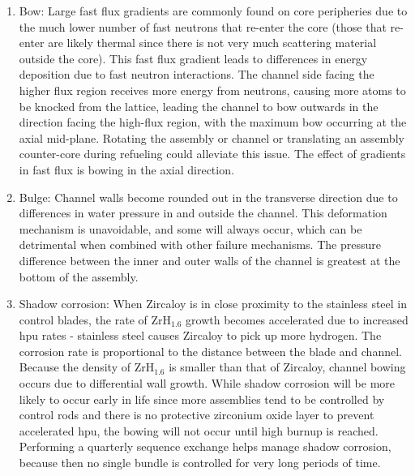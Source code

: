 \documentclass[10pt]{article}
\begin{document}
\begin{enumerate}
\item Bow: Large fast flux gradients are commonly found on core peripheries due to the much lower number of fast neutrons that re-enter the core (those that re-enter are likely thermal since there is not very much scattering material outside the core). This fast flux gradient leads to differences in energy deposition due to fast neutron interactions. The channel side facing the higher flux region receives more energy from neutrons, causing more atoms to be knocked from the lattice, leading the channel to bow outwards in the direction facing the high-flux region, with the maximum bow occurring at the axial mid-plane. Rotating the assembly or channel or translating an assembly counter-core during refueling could alleviate this issue. The effect of gradients in fast flux is bowing in the axial direction.
\item Bulge: Channel walls become rounded out in the transverse direction due to differences in water pressure in and outside the channel. This deformation mechanism is unavoidable, and some will always occur, which can be detrimental when combined with other failure mechanisms. The pressure difference between the inner and outer walls of the channel is greatest at the bottom of the assembly.
\item Shadow corrosion: When Zircaloy is in close proximity to the stainless steel in control blades, the rate of \(\textrm{ZrH}_{1.6}\) growth becomes accelerated due to increased \gls{hpu} rates - stainless steel causes Zircaloy to pick up more hydrogen. The corrosion rate is proportional to the distance between the blade and channel. Because the density of \(\textrm{ZrH}_{1.6}\) is smaller than that of Zircaloy, channel bowing occurs due to differential wall growth. While shadow corrosion will be more likely to occur early in life since more assemblies tend to be controlled by control rods and there is no protective zirconium oxide layer to prevent accelerated \gls{hpu}, the bowing will not occur until high burnup is reached. Performing a quarterly sequence exchange helps manage shadow corrosion, because then no single bundle is controlled for very long periods of time.
\end{enumerate}
\end{document}
